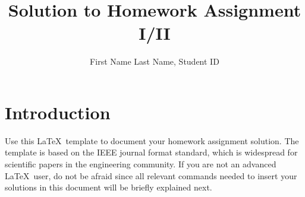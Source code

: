 \documentclass[journal]{IEEEtran}
\begin{document}
\title{Solution to Homework Assignment I/II}

\author{First Name Last Name, Student ID}


\maketitle


\section{Introduction}
Use this \LaTeX\ template to document your  homework assignment solution. The template is based on the IEEE journal format standard, which is widespread for scientific papers in the engineering community. If you are not an advanced \LaTeX\ user, do not be afraid since all relevant commands needed to insert your solutions in this document will be briefly explained next.    
\end{document}
